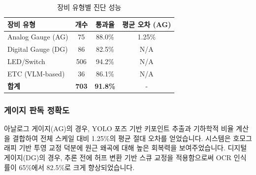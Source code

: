 \begin{table}[h]
\caption{장비 유형별 진단 성능}
\label{tab:matching_results}
\centering
\begin{tabular}{|l|c|c|c|}
\hline
\textbf{장비 유형} & \textbf{개수} & \textbf{통과율} & \textbf{평균 오차 (AG)} \\
\hline
Analog Gauge (AG) & 75 & 88.0\% & 1.25\% \\
Digital Gauge (DG) & 86 & 82.5\% & N/A \\
LED/Switch & 506 & 94.2\% & N/A \\
ETC (VLM-based) & 36 & 86.1\% & N/A \\
\hline
\textbf{합계} & \textbf{703} & \textbf{91.8\%} & - \\
\hline
\end{tabular}
\end{table}

\subsubsection{게이지 판독 정확도}
아날로그 게이지(AG)의 경우, YOLO 포즈 기반 키포인트 추출과 기하학적 비율 계산을 결합하여 전체 스케일 대비 1.25\%의 평균 절대 오차를 얻었습니다.
시스템은 호모그래피 기반 투영 교정 덕분에 원근 왜곡에 대해 높은 회복력을 보여주었습니다.
디지털 게이지(DG)의 경우, 추론 전에 허프 변환 기반 스큐 교정을 적용함으로써 OCR 인식률이 65\%에서 82.5\%로 크게 향상되었습니다.


